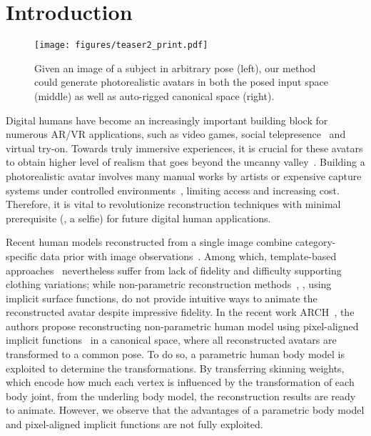 \documentclass[10pt,twocolumn,letterpaper]{article}
\newcommand{\beforefigcaption}{\vspace{-5mm}}
\newcommand{\afterfigcaption}{\vspace{-5mm}}
\newcommand{\beforesection}{\vspace{-1.5mm}}
\newcommand{\aftersection}{\vspace{-1.5mm}}
\begin{document}
\vspace{-2mm}
\beforesection
\section{Introduction} \label{sec:intro}
\aftersection

\begin{figure}[ptb]
\centering
\texttt{[image: figures/teaser2\_print.pdf]}
\beforefigcaption
\caption{Given an image of a subject in arbitrary pose (left), our method could generate photorealistic avatars in both the posed input space (middle) as well as auto-rigged canonical space (right).}
\afterfigcaption
\label{fig:intro}
\end{figure}

Digital humans have become an increasingly important building block for numerous AR/VR applications, such as video games, social telepresence~\cite{orts2016holoportation, lombardi2018deep} and virtual try-on. Towards truly immersive experiences, it is crucial for these avatars to obtain higher level of realism that goes beyond the uncanny valley~\cite{mori2012uncanny}. Building a photorealistic avatar involves many manual works by artists or expensive capture systems under controlled environments~\cite{collet2015high, guo2019relightables, mathias21unoc}, limiting access and increasing cost. Therefore, it is vital to revolutionize reconstruction techniques with minimal prerequisite (\eg, a selfie) for future digital human applications.

Recent human models reconstructed from a single image combine category-specific data prior with image observations~\cite{andrei20nflow,joo2020eft,xu21posegrammar}. Among which, template-based approaches~\cite{kanazawa2018hmr, SPINICCV19, DenseRaCICCV19, Tex2ShapeICCV19, bhatnagar2019mgn} nevertheless suffer from lack of fidelity and difficulty supporting clothing variations; 
while non-parametric reconstruction methods~\cite{PIFuICCV19, DeepHumanICCV19, saito2020pifuhd, he2020geopifu}, \eg, using implicit surface functions, do not provide intuitive ways to animate the reconstructed avatar despite impressive fidelity. 
In the recent work ARCH~\cite{huang2020arch}, the authors propose reconstructing non-parametric human model using pixel-aligned implicit functions~\cite{PIFuICCV19} in a canonical space, where all reconstructed avatars are transformed to a common pose. To do so, a parametric human body model is exploited to determine the transformations. By transferring skinning weights, which encode how much each vertex is influenced by the transformation of each body joint, from the underling body model, the reconstruction results are ready to animate. However, we observe that the advantages of a parametric body model and pixel-aligned implicit functions are not fully exploited. 
\end{document}
